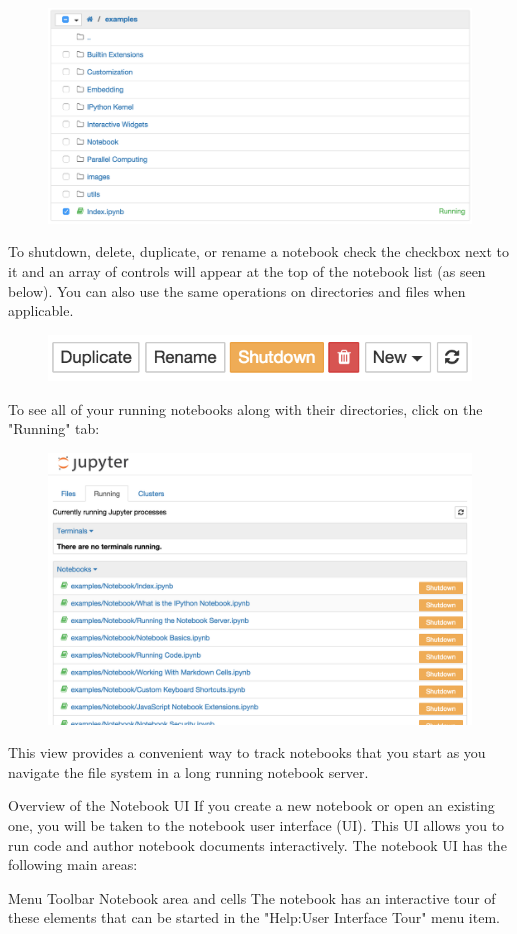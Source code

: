 \begin{figure}
    \centering
    \includegraphics[width=0.5\linewidth]{dashboard_files_tab_run.png}
\end{figure}

To shutdown, delete, duplicate, or rename a notebook check the checkbox next to it and an array of controls will appear at the top of the notebook list (as seen below). You can also use the same operations on directories and files when applicable.

\begin{figure}
    \centering
    \includegraphics[width=0.5\linewidth]{dashboard_files_tab_btns.png}
\end{figure}

To see all of your running notebooks along with their directories, click on the "Running" tab:

\begin{figure}
    \centering
    \includegraphics[width=0.5\linewidth]{dashboard_running_tab.png}
\end{figure}

This view provides a convenient way to track notebooks that you start as you navigate the file system in a long running notebook server.

Overview of the Notebook UI
If you create a new notebook or open an existing one, you will be taken to the notebook user interface (UI). This UI allows you to run code and author notebook documents interactively. The notebook UI has the following main areas:

\titem Menu
\titem Toolbar
\titem Notebook area and cells
The notebook has an interactive tour of these elements that can be started in the "Help:User Interface Tour" menu item.

